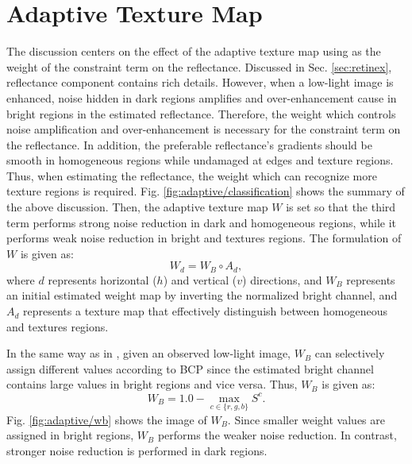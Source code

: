 \section{Adaptive Texture Map} \label{sec:adaptive}
The discussion centers on the effect of the adaptive texture map using as the weight of the constraint term on the reflectance. Discussed in Sec. \ref{sec:retinex}, reflectance component contains rich details. However, when a low-light image is enhanced, noise hidden in dark regions amplifies and over-enhancement cause in bright regions in the estimated reflectance. Therefore, the weight which controls noise amplification and over-enhancement is necessary for the constraint term on the reflectance. In addition, the preferable reflectance's gradients should be smooth in homogeneous regions while undamaged at edges and texture regions. Thus, when estimating the reflectance, the weight which can recognize more texture regions is required. Fig. \ref{fig:adaptive/classification} shows the summary of the above discussion.
Then, the adaptive texture map $W$ is set so that the third term performs strong noise reduction in dark and homogeneous regions, while it performs weak noise reduction in bright and textures regions. 
The formulation of $W$ is given as:
\begin{equation}
W_{d} = W_{B} \circ A_{d}, \label{eq: adaptive_texture}
\end{equation}
where $d$ represents horizontal ($h$) and vertical ($v$) directions, and $W_{B}$ represents an initial estimated weight map by inverting the normalized bright channel, and $A_{d}$ represents a texture map that effectively distinguish between homogeneous and textures regions.\par
In the same way as in \cite{activation}, given an observed low-light image, $W_{B}$ can selectively assign different values according to BCP since the estimated bright channel contains large values in bright regions and vice versa. 
Thus, $W_{B}$ is given as:
\begin{equation}
W_{B} = 1.0 - \max_{c \in \{r, g, b\}}S^{c}. \label{eq: initial_weight}
\end{equation}
Fig. \ref{fig:adaptive/wb} shows the image of $W_{B}$. Since smaller weight values are assigned in bright regions, $W_{B}$ performs the weaker noise reduction. In contrast, stronger noise reduction is performed in dark regions.\par
 
